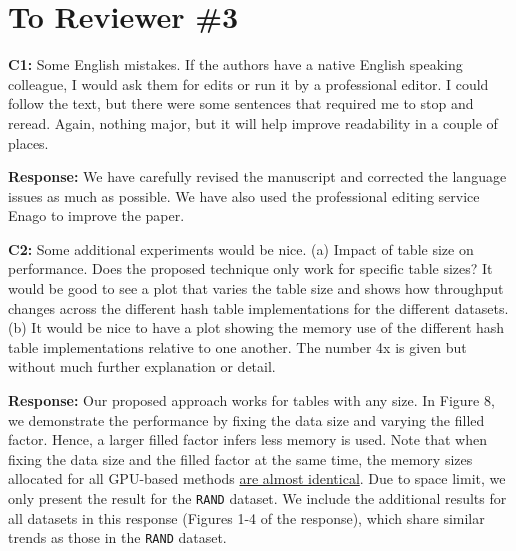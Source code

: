 \section*{To Reviewer \#3}

\begin{shaded}
	\noindent\textbf{C1:} Some English mistakes.  If the authors have a native English speaking colleague, I would ask them for edits or run it by a professional editor.  I could follow the text, but there were some sentences that required me to stop and reread.  Again, nothing major, but it will help improve readability in a couple of places.
\end{shaded}
%
\noindent\textbf{Response:} 
We have carefully revised the manuscript and corrected the language issues as much as possible. We have also used the professional editing service Enago to improve the paper. 

\begin{shaded}
	\noindent\textbf{C2:} Some additional experiments would be nice.
	(a) Impact of table size on performance.  Does the proposed technique only work for specific table sizes?  It would be good to see a plot that varies the table size and shows how throughput changes across the different hash table implementations for the different datasets.
	(b) It would be nice to have a plot showing the memory use of the different hash table implementations relative to one another.  The number 4x is given but without much further explanation or detail.
\end{shaded}
%
\noindent\textbf{Response:} 
Our proposed approach works for tables with any size. 
In Figure 8, we demonstrate the performance by fixing the data size and varying the filled factor. 
Hence, a larger filled factor infers less memory is used.
Note that when fixing the data size and the filled factor at the same time, the memory sizes allocated for all GPU-based methods \underline{are almost identical}.  
Due to space limit, we only present the result for the {\tt RAND} dataset.
We include the additional results for all datasets in this response (Figures 1-4 of the response), which share similar trends as those in the {\tt RAND} dataset.

